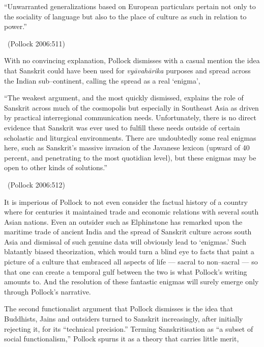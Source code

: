 \begin{myquote}
“Unwarranted generalizations based on European particulars pertain not only to the sociality of language but also to the place of culture as such in relation to power.” 

~\hfill (Pollock 2006:511)
\end{myquote}

With no convincing explanation, Pollock dismisses with a casual mention the idea that Sanskrit could have been used for \textit{vyāvahārika} purposes and spread across the Indian sub–continent, calling the spread as a real ‘enigma’,

\begin{myquote}
“The weakest argument, and the most quickly dismissed, explains the role of Sanskrit across much of the cosmopolis but especially in Southeast Asia as driven by practical interregional communication needs. Unfortunately, there is no direct evidence that Sanskrit was ever used to fulfill these needs outside of certain scholastic and liturgical environments. There are undoubtedly some real enigmas here, such as Sanskrit’s massive invasion of the Javanese lexicon (upward of 40 percent, and penetrating to the most quotidian level), but these enigmas may be open to other kinds of solutions.” 

~\hfill (Pollock 2006:512)
\end{myquote}

It is imperious of Pollock to not even consider the factual history of a country where for centuries it maintained trade and economic relations with several south Asian nations. Even an outsider such as Elphinstone has remarked upon the maritime trade of ancient India and the spread of Sanskrit culture across south Asia and dismissal of such genuine data will obviously lead to ‘enigmas.’ Such blatantly biased theorization, which would turn a blind eye to facts that paint a picture of a culture that embraced all aspects of life — sacral to non–sacral — so that one can create a temporal gulf between the two is what Pollock’s writing amounts to. And the resolution of these fantastic enigmas will surely emerge only through Pollock’s narrative.

The second functionalist argument that Pollock dismisses is the idea that Buddhists, Jains and outsiders turned to Sanskrit increasingly, after initially rejecting it, for its “technical precision.” Terming Sanskritisation as “a subset of social functionalism,” Pollock spurns it as a theory that carries little merit,

